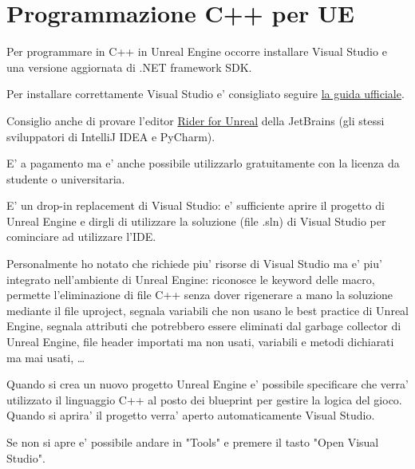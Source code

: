 \chapter{Programmazione C++ per UE} \label{chapter:cpp}

    Per programmare in C++ in Unreal Engine occorre installare Visual Studio e una versione aggiornata di .NET framework SDK.
    \begin{suggestionbox}
        Per installare correttamente Visual Studio e' consigliato seguire \href{https://docs.unrealengine.com/5.0/en-US/setting-up-visual-studio-development-environment-for-cplusplus-projects-in-unreal-engine/}{la guida ufficiale}.
    \end{suggestionbox}

    \begin{suggestionbox}
        Consiglio anche di provare l'editor \href{https://www.jetbrains.com/lp/rider-unreal/}{Rider for Unreal} della JetBrains (gli stessi sviluppatori di IntelliJ IDEA e PyCharm).

        E' a pagamento ma e' anche possibile utilizzarlo gratuitamente con la licenza da studente o universitaria.

        E' un drop-in replacement di Visual Studio: e' sufficiente aprire il progetto di Unreal Engine e dirgli di utilizzare la soluzione (file .sln) di Visual Studio per cominciare ad utilizzare l'IDE.

        Personalmente ho notato che richiede piu' risorse di Visual Studio ma e' piu' integrato nell'ambiente di Unreal Engine:
        riconosce le keyword delle macro, permette l'eliminazione di file C++ senza dover rigenerare a mano la soluzione mediante il file uproject,
        segnala variabili che non usano le best practice di Unreal Engine, segnala attributi che potrebbero essere eliminati dal garbage collector di Unreal Engine,
        file header importati ma non usati, variabili e metodi dichiarati ma mai usati, \dots
    \end{suggestionbox}

    Quando si crea un nuovo progetto Unreal Engine e' possibile specificare che verra' utilizzato il linguaggio C++ al posto dei blueprint per gestire la logica del gioco.
    Quando si aprira' il progetto verra' aperto automaticamente Visual Studio.
    \begin{notebox}
        Se non si apre e' possibile andare in "Tools" e premere il tasto "Open Visual Studio".
    \end{notebox}

